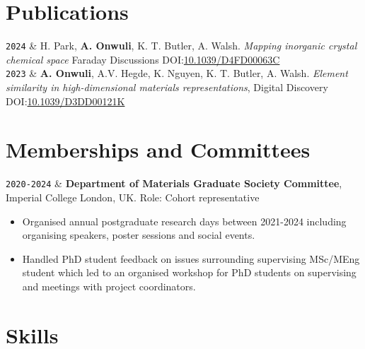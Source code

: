 \documentclass[11pt,a4paper]{article}
\newcommand{\ICL}{Imperial College London}
\newcommand{\LastName}{Onwuli}
\newcommand{\Initials}{A}
\newcommand{\Me}{\textbf{\Initials. \LastName}}  %
\newcommand{\Aron}{A. Walsh}
\newcommand{\Keith}{K. T. Butler}
\newcommand{\Ashish}{A.V. Hegde}
\newcommand{\Kevin}{K. Nguyen}
\newcommand{\Hyunsoo}{H. Park}
\newcommand{\Duration}[2]{\fontsize{10pt}{0}\selectfont \texttt{#1-#2}}
\newcommand{\Year}[1]{\fontsize{10pt}{0}\selectfont \texttt{#1}}
\newcommand{\DOI}[1]{DOI:\href{https://doi.org/#1}{#1}}
\begin{document}
\section{Publications}

\begin{EntriesTableYear}
  \Year{2024} &
  \Hyunsoo, \Me, \Keith, \Aron.
  \textit{Mapping inorganic crystal chemical space}
  \newline
  Faraday Discussions
  \DOI{10.1039/D4FD00063C}
  \\
  \Year{2023}  &
  \Me, \Ashish, \Kevin, \Keith, \Aron.
  \textit{Element similarity in high-dimensional materials representations},
  \newline
  Digital Discovery
  \DOI{10.1039/D3DD00121K}
  \\
\end{EntriesTableYear}
\section{Memberships and Committees}

\begin{EntriesTableDuration}
  \Duration{2020}{2024} &
  \textbf{Department of Materials Graduate Society Committee}, \ICL{}, UK.
  \newline
  Role: Cohort representative
  \begin{itemize}
    \item Organised annual postgraduate research days between 2021-2024  including organising speakers, poster sessions and social events.
    \item Handled PhD student feedback on issues surrounding supervising MSc/MEng student which led to an organised workshop for PhD students on supervising and meetings with project coordinators.
    \vspace{-\baselineskip}
  \end{itemize}
  \vspace{-\baselineskip}
\end{EntriesTableDuration}
\section{Skills}
\end{document}
